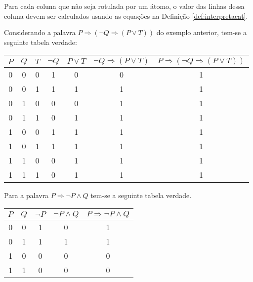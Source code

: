 Para cada coluna que não seja rotulada por um átomo, o valor das linhas dessa coluna devem ser calculados usando as equações na Definição \ref{def:interpretacat}.

\begin{exem}
    Considerando a palavra $P \Rightarrow (\neg Q \Rightarrow (P \lor T))$ do exemplo anterior, tem-se a seguinte tabela verdade:
    \begin{table*}[ht]
        \centering
        \scriptsize
        \begin{tabular}{|c|c|c|c|c|c|c|}
             \hline
             $P$ & $Q$ & $T$ & $\neg Q$ & $P \lor T$ & $\neg Q \Rightarrow (P \lor T)$ & $P \Rightarrow (\neg Q \Rightarrow (P \lor T))$  \\
             \hline
             0 & 0 & 0 & 1 & 0 & 0 & 1\\
             \hline
             0 & 0 & 1 & 1 & 1 & 1 & 1\\
             \hline
             0 & 1 & 0 & 0 & 0 & 1 & 1\\
             \hline
             0 & 1 & 1 & 0 & 1 & 1 & 1\\
             \hline
             1 & 0 & 0 & 1 & 1 & 1 & 1\\
             \hline
             1 & 0 & 1 & 1 & 1 & 1 & 1\\
             \hline
             1 & 1 & 0 & 0 & 1 & 1 & 1\\
             \hline
             1 & 1 & 1 & 0 & 1 & 1 & 1\\
             \hline
        \end{tabular}
    \end{table*}
\end{exem}

\begin{exem}
    Para a palavra $P \Rightarrow \neg P \land Q$ tem-se a seguinte tabela verdade.
    \begin{table*}[ht]
        \centering
        \scriptsize
        \begin{tabular}{|c|c|c|c|c|}
             \hline
             $P$ & $Q$ & $\neg P$ & $\neg P \land Q$ & $P \Rightarrow \neg P \land Q$ \\ \hline
             0 & 0 & 1 & 0 & 1 \\ \hline
             0 & 1 & 1 & 1 & 1 \\ \hline
             1 & 0 & 0 & 0 & 0 \\ \hline
             1 & 1 & 0 & 0 & 0 \\ \hline
        \end{tabular}
    \end{table*}
\end{exem}

